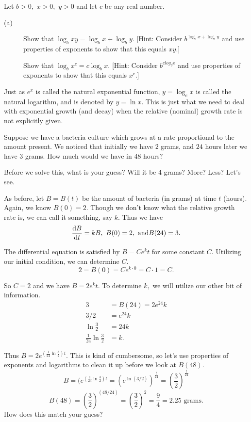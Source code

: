 \begin{embeddedproblem}{}
  Let $b>0,$ $x>0,$ $y>0$ and  let $c$ be any real number.
  \begin{description}
  \item[(a)] Show that $\log_b  xy=\log_b x+\log_b y.$  [Hint: Consider
    $b^{\log_b x+\log_b y}$  and use properties of exponents to show that
    this equals $xy.$]

    Show that $\log_b x^c =c \log_b x.$  [Hint: Consider $b^{c
      log_b x}$ and use properties of exponents to show that this
    equals $x^c.$]
  \end{description}
\end{embeddedproblem}

Just as $e^x$ is called the natural exponential function, $y=\log_e x$
is called the natural logarithm, and is denoted by $y=\ln x.$  This is
just what we need to deal with exponential growth (and decay) when the
relative (nominal) growth rate is not explicitly given.

\begin{myexample}
Suppose we have a bacteria culture which grows at a rate proportional
to the amount present.  We noticed that initially we have $2$ grams, and
$24$ hours later we have $3$ grams.  How much would we have in $48$ hours? 

Before we solve this, what is your guess?  Will it be $4$ grams? More?
Less?  Let's see.

As before, let $B=B(t)$ be the amount of bacteria (in grams) at time $t$ 
(hours).  Again, we know $B(0)=2.$  Though we don't know what the
relative growth rate is, we can call it something, say $k.$  Thus we
have 
$$
\frac{\text{d}{B}}{\text{d}{t}}=kB,\  B(0)=2,\text{ and} B(24)=3.
$$

The differential equation is satisfied by $B=Ce^kt$ for some constant
$C.$ Utilizing our initial condition, we can determine $C.$ 
$$
2=B(0)=Ce^{k\cdot0}=C\cdot1=C.
$$

So $C=2$ and we have $B=2e^kt.$  To determine $k,$ we will utilize our
other bit of information. 
\begin{align*}
  3&=B(24)=2e^24k \\
  3/2&=e^24k\\
  \ln \frac{3}{2}&=24k\\
  \frac{1}{24} \ln \frac{3}{2}&=k.
\end{align*}

Thus $B=2e^{\left(\frac{1}{24} \ln \frac{3}{2}\right)t}.$  This is kind
of cumbersome, so let's use properties of exponents and logarithms to
clean it up before we look at $B(48).$ 
$$
B=(e^{\left(\frac{1}{24} \ln \frac{3}{2}\right)t} = \left(e^{\ln(3/2)}\right)^\frac{t}{24}  =\left(\frac{3}{2}\right)^{\frac{t}{24}}
$$
$$
B(48)=\left(\frac{3}{2}\right)^(48/24)=\left(\frac{3}{2}\right)^2=\frac{9}{4}=2.25
\text{ grams}.
$$
How does this match your guess?  
\end{myexample}

